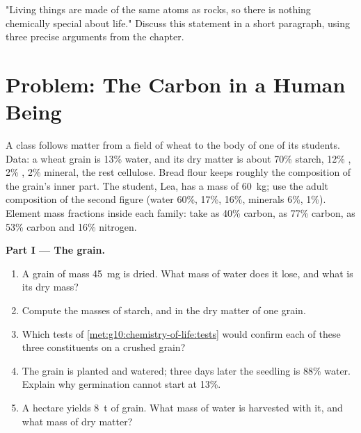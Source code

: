 \begin{exercise}[$\star\star\star$]\label{exo:g10:chemistry-of-life:15}
"Living things are made of the same atoms as rocks, so there is
nothing chemically special about life." Discuss this statement in a
short paragraph, using three precise arguments from the chapter.
\end{exercise}

\section{Problem: The Carbon in a Human Being}

\begin{problem}
\label{pb:g10:chemistry-of-life:1}
A class follows matter from a field of wheat to the body of one of its
students. Data: a wheat grain is 13\% water, and its dry matter is
about 70\% starch, 12\% , 2\% , 2\% mineral, the rest
cellulose. Bread flour keeps roughly the composition of the grain's
inner part. The student, Lea, has a mass of \qty{60}{kg}; use the
adult composition of the second figure (water 60\%,  17\%,
 16\%, minerals 6\%,  1\%). Element mass fractions
inside each family: take  as 40\% carbon,  as 77\%
carbon,  as 53\% carbon and 16\% nitrogen.

\medskip
\noindent\textbf{Part I --- The grain.}
\begin{enumerate}
  \item A grain of mass \qty{45}{mg} is dried. What mass of water does
        it lose, and what is its dry mass?
  \item Compute the masses of starch,  and  in the dry
        matter of one grain.
  \item Which tests of \cref{met:g10:chemistry-of-life:tests} would
        confirm each of these three constituents on a crushed grain?
  \item The grain is planted and watered; three days later the seedling
        is 88\% water. Explain why germination cannot start at 13\%.
  \item A hectare yields \qty{8}{t} of grain. What mass of water is
        harvested with it, and what mass of dry matter?
\end{enumerate}


\end{problem}
